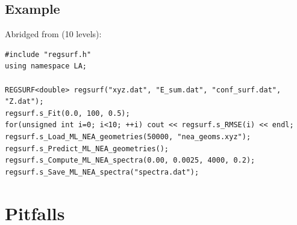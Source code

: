 \subsection{Example}
Abridged from  (10 levels):
\begin{lstlisting}
#include "regsurf.h"
using namespace LA;

REGSURF<double> regsurf("xyz.dat", "E_sum.dat", "conf_surf.dat", "Z.dat");
regsurf.s_Fit(0.0, 100, 0.5);
for(unsigned int i=0; i<10; ++i) cout << regsurf.s_RMSE(i) << endl;
regsurf.s_Load_ML_NEA_geometries(50000, "nea_geoms.xyz");
regsurf.s_Predict_ML_NEA_geometries();
regsurf.s_Compute_ML_NEA_spectra(0.00, 0.0025, 4000, 0.2);
regsurf.s_Save_ML_NEA_spectra("spectra.dat");
\end{lstlisting}

\section{Pitfalls}\label{sec:regression:pitfalls}
